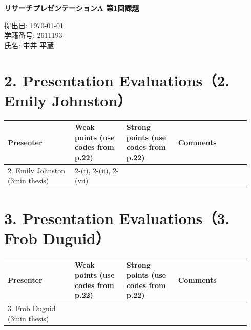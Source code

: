 \documentclass[11pt,a4paper]{ltjsarticle}
\begin{document}
\begin{center}
{\LARGE \textbf{リサーチプレゼンテーションA 第1回課題}}
\end{center}
\vspace{1em}

\begin{flushright}
提出日: \today \\
学籍番号: 2611193 \\
氏名: 中井 平蔵
\end{flushright}

\section*{2. Presentation Evaluations（2. Emily Johnston）}
\begin{tabular}{|p{0.26\linewidth}|p{0.2\linewidth}|p{0.2\linewidth}|p{0.28\linewidth}|}
\hline
Presenter & Weak points (use codes from p.22) & Strong points (use codes from p.22) & Comments \\
\hline
2. Emily Johnston (3min thesis) & 2-(i), 2-(ii), 2-(vii) &  &  \\
\hline
\end{tabular}

\vspace{1.5em}

\section*{3. Presentation Evaluations（3. Frob Duguid）}
\begin{tabular}{|p{0.26\linewidth}|p{0.2\linewidth}|p{0.2\linewidth}|p{0.28\linewidth}|}
\hline
Presenter & Weak points (use codes from p.22) & Strong points (use codes from p.22) & Comments \\
\hline
3. Frob Duguid (3min thesis) &  &  &  \\
\hline
\end{tabular}
\end{document}
